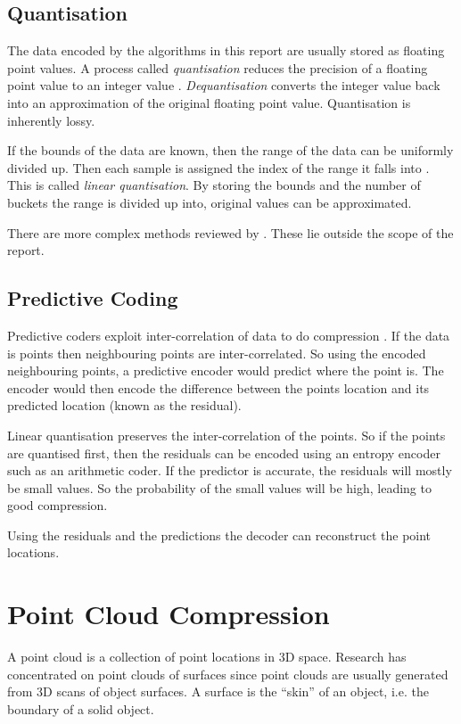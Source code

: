 \documentclass{report}
\begin{document}
\subsection{Quantisation}

The data encoded by the algorithms in this report are usually stored as
floating point values. A process called \emph{quantisation} reduces the
precision of a floating point value to an integer value
\citep{ag-racm-03}. \emph{Dequantisation} converts the integer value back into
an approximation of the original floating point value. Quantisation is
inherently lossy.

If the bounds of the data are known, then the range of the data can be
uniformly divided up. Then each sample is assigned the index of the range it
falls into \citep{drozdek}. This is called \emph{linear quantisation}. By
storing the bounds and the number of buckets the range is divided up into,
original values can be approximated.

There are more complex methods reviewed by \citep{ag-racm-03}. These lie
outside the scope of the report.


\subsection{Predictive Coding}

Predictive coders exploit inter-correlation of data to do compression
\citep{drozdek}. If the data is points then neighbouring points are
inter-correlated. So using the encoded neighbouring points, a predictive
encoder would predict where the point is. The encoder would then encode the
difference between the points location and its predicted location (known as
the residual).

Linear quantisation preserves the inter-correlation of the points. So if the
points are quantised first, then the residuals can be encoded using an entropy
encoder such as an arithmetic coder. If the predictor is accurate, the
residuals will mostly be small values. So the probability of the small values
will be high, leading to good compression.

Using the residuals and the predictions the decoder can reconstruct the point
locations.


\section{Point Cloud Compression}

A point cloud is a collection of point locations in 3D space. Research has
concentrated on point clouds of surfaces since point clouds are usually
generated from 3D scans of object surfaces. A surface is the ``skin'' of an
object, i.e. the boundary of a solid object.
\end{document}
